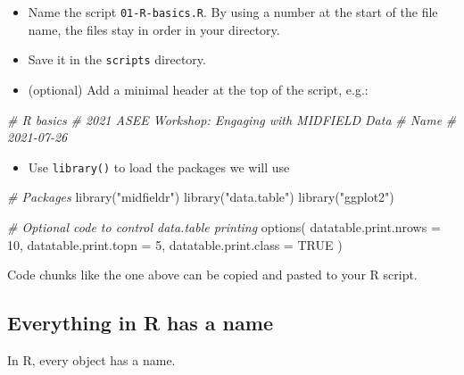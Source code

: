 \documentclass[
]{book}
\newenvironment{Shaded}{\begin{snugshade}}{\end{snugshade}}
\newcommand{\AttributeTok}[1]{\textcolor[rgb]{0.77,0.63,0.00}{#1}}
\newcommand{\CommentTok}[1]{\textcolor[rgb]{0.56,0.35,0.01}{\textit{#1}}}
\newcommand{\ConstantTok}[1]{\textcolor[rgb]{0.00,0.00,0.00}{#1}}
\newcommand{\DecValTok}[1]{\textcolor[rgb]{0.00,0.00,0.81}{#1}}
\newcommand{\FunctionTok}[1]{\textcolor[rgb]{0.00,0.00,0.00}{#1}}
\newcommand{\NormalTok}[1]{#1}
\newcommand{\StringTok}[1]{\textcolor[rgb]{0.31,0.60,0.02}{#1}}
\providecommand{\tightlist}{%
  \setlength{\itemsep}{0pt}\setlength{\parskip}{0pt}}
\begin{document}
\begin{itemize}
\tightlist
\item
  Name the script \texttt{01-R-basics.R}. By using a number at the start of the file name, the files stay in order in your directory.\\
\item
  Save it in the \texttt{scripts} directory.
\item
  (optional) Add a minimal header at the top of the script, e.g.:
\end{itemize}

\begin{Shaded}
\begin{Highlighting}[]
\CommentTok{\# R basics }
\CommentTok{\# 2021 ASEE Workshop: Engaging with MIDFIELD Data}
\CommentTok{\# Name }
\CommentTok{\# 2021{-}07{-}26}
\end{Highlighting}
\end{Shaded}

\begin{itemize}
\tightlist
\item
  Use \texttt{library()} to load the packages we will use
\end{itemize}

\begin{Shaded}
\begin{Highlighting}[]
\CommentTok{\# Packages}
\FunctionTok{library}\NormalTok{(}\StringTok{"midfieldr"}\NormalTok{)}
\FunctionTok{library}\NormalTok{(}\StringTok{"data.table"}\NormalTok{)}
\FunctionTok{library}\NormalTok{(}\StringTok{"ggplot2"}\NormalTok{)}

\CommentTok{\# Optional code to control data.table printing}
\FunctionTok{options}\NormalTok{(}
  \AttributeTok{datatable.print.nrows =} \DecValTok{10}\NormalTok{,}
  \AttributeTok{datatable.print.topn =} \DecValTok{5}\NormalTok{,}
  \AttributeTok{datatable.print.class =} \ConstantTok{TRUE}
\NormalTok{)}
\end{Highlighting}
\end{Shaded}

Code chunks like the one above can be copied and pasted to your R script.

\hypertarget{everything-in-r-has-a-name}{%
\subsection{Everything in R has a name}\label{everything-in-r-has-a-name}}

In R, every object has a name.
\end{document}
